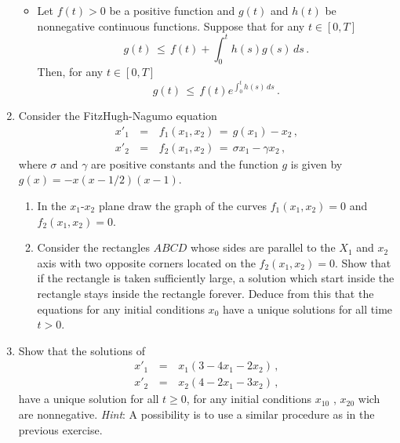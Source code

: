 \documentclass[12pt]{report}
\newcommand{\nn}{\nonumber}
\begin{document}
\begin{enumerate}
\begin{itemize}
\item 
Let $f(t)>0$ be a positive function and $g(t)$ and $h(t)$ be nonnegative continuous functions. 
Suppose that for any $t \in [0,T]$ 
\begin{equation}
g(t) \,\le\, f(t) + \int_{0}^t h(s) g(s) \, ds \,.
\end{equation}
Then, for any $t \in [0,T]$
\begin{equation}
g(t)\,\le\, f(t) e^{\int_0^t h(s)\, ds} \,. 
\end{equation}
\end{itemize}



\item Consider the FitzHugh-Nagumo equation
\begin{eqnarray}
x'_1 &\,=\,& f_1(x_1, x_2) \,=\, g(x_1) - x_2 \,, \nn \\
x'_2 &\,=\,& f_2(x_1,x_2)\,=\, \sigma x_1 - \gamma x_2 \,,  
\end{eqnarray}
where $\sigma$ and $\gamma$ are positive constants and 
the function $g$ is given by $g(x) = - x (x- 1/2) (x-1)$.   
\begin{enumerate}
\item In the $x_1$-$x_2$ plane draw the graph of the curves 
$f_1(x_1, x_2)=0$ and $f_2(x_1,x_2)=0$. 
\item Consider the rectangles $ABCD$ whose sides are parallel to the $X_1$ and 
$x_2$ axis with two opposite corners located on the $f_2(x_1,x_2)=0$. Show 
that if the rectangle is taken sufficiently large, a solution which start 
inside the rectangle stays inside the rectangle forever. Deduce from this that 
the equations for any initial conditions $x_0$ have a unique solutions for all 
time $t>0$. 
\end{enumerate}

\item Show that the solutions of 
\begin{eqnarray}
x'_1 &\,=\,& x_1( 3 - 4x_1 -2x_2) \,,  \nn \\
x'_2 &\,=\,& x_2( 4 - 2 x_1 -3x_2) \,,
\end{eqnarray}
have a unique solution for all $t\ge 0$, for any initial conditions
$x_{10}$ , $x_{20}$ wich are nonnegative.  {\em Hint}: A possibility
is to use a similar procedure as in the previous exercise.


\end{enumerate}
\end{document}
